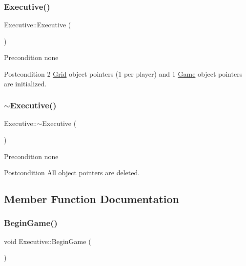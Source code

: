 \subsubsection{\texorpdfstring{Executive()}{Executive()}}
{\footnotesize\ttfamily Executive\+::\+Executive (\begin{DoxyParamCaption}{ }\end{DoxyParamCaption})}

\begin{DoxyPrecond}{Precondition}
none 
\end{DoxyPrecond}
\begin{DoxyPostcond}{Postcondition}
2 \hyperlink{classGrid}{Grid} object pointers (1 per player) and 1 \hyperlink{classGame}{Game} object pointers are initialized. 
\end{DoxyPostcond}
\mbox{\label{classExecutive_a4ce80c499f7640b1770ade77cf56d965}} 
\subsubsection{\texorpdfstring{$\sim$\+Executive()}{~Executive()}}
{\footnotesize\ttfamily Executive\+::$\sim$\+Executive (\begin{DoxyParamCaption}{ }\end{DoxyParamCaption})}

\begin{DoxyPrecond}{Precondition}
none 
\end{DoxyPrecond}
\begin{DoxyPostcond}{Postcondition}
All object pointers are deleted. 
\end{DoxyPostcond}


\subsection{Member Function Documentation}
\mbox{\label{classExecutive_a1a5fd9d5a7357663b31bae642e0723d9}} 
\subsubsection{\texorpdfstring{Begin\+Game()}{BeginGame()}}
{\footnotesize\ttfamily void Executive\+::\+Begin\+Game (\begin{DoxyParamCaption}{ }\end{DoxyParamCaption})}




